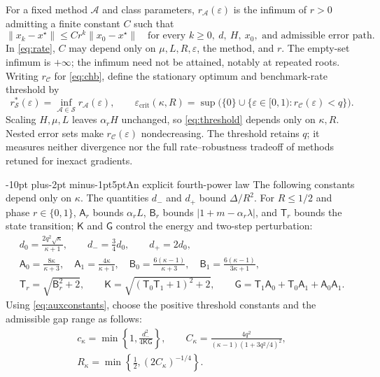 \documentclass[pdflatex,sn-mathphys-num]{sn-jnl}
\makeatletter
\renewcommand\section{\@startsection{section}{1}{\z@}%
  {-10pt plus-2pt minus-1pt}{5pt}{\sectionfont}}
\theoremstyle{thmstyleone}
\theoremstyle{thmstyletwo}
\newcommand{\crit}{\mathrm{crit}}
\newcommand{\cT}{\mathsf T}
\newcommand{\cK}{\mathsf K}
\newcommand{\cG}{\mathsf G}
\newcommand{\norm}[1]{\left\lVert #1\right\rVert}
\makeatother
\begin{document}
For a fixed method $\mathcal A$ and class parameters,
$r_{\mathcal A}(\varepsilon)$ is the infimum of $r>0$ admitting
a finite constant $C$ such that
\begin{equation}\label{eq:rate}
 \norm{x_k-x^\star}\leq C r^k\norm{x_0-x^\star}
 \quad\text{for every }k\geq0,\ d,\ H,\ x_0,\text{ and admissible error path}.
\end{equation}
In \eqref{eq:rate}, $C$ may depend only on $\mu,L,R,\varepsilon$,
the method, and $r$. The empty-set infimum is $+\infty$;
the infimum need not be attained, notably at repeated roots.
Writing $r_{\mathcal C}$ for \eqref{eq:chb}, define the stationary
optimum and benchmark-rate threshold by
\begin{equation}\label{eq:threshold}
 r_{\mathcal S}^*(\varepsilon)
   =\inf_{\mathcal A\in\mathcal S}r_{\mathcal A}(\varepsilon),
 \qquad
 \varepsilon_{\crit}(\kappa,R)
   =\sup\bigl(\{0\}\cup
     \{\varepsilon\in[0,1):r_{\mathcal C}(\varepsilon)<q\}\bigr).
\end{equation}
Scaling $H,\mu,L$ leaves $\alpha_rH$ unchanged, so
\eqref{eq:threshold} depends only on $\kappa,R$. Nested error sets make
$r_{\mathcal C}(\varepsilon)$ nondecreasing. The threshold retains $q$;
it measures neither divergence nor the full rate--robustness tradeoff
of methods retuned for inexact gradients.

\section{An explicit fourth-power law}\label{sec:main}
The following constants depend only on $\kappa$. The quantities $d_-$
and $d_+$ bound $\Delta/R^2$. For $R\leq1/2$ and phase $r\in\{0,1\}$,
$\mathsf A_r$ bounds $\alpha_rL$, $\mathsf B_r$ bounds
$|1+m-\alpha_r\lambda|$, and $\cT_r$ bounds the state transition;
$\cK$ and $\cG$ control the energy and two-step perturbation:
\begin{equation}\label{eq:auxconstants}
\begin{gathered}
 d_0=\frac{2q^2\sqrt\kappa}{\kappa+1},\qquad
 d_-=\tfrac34d_0,\qquad d_+=2d_0,\\
 \mathsf A_0=\frac{8\kappa}{\kappa+3},\quad
 \mathsf A_1=\frac{4\kappa}{\kappa+1},\quad
 \mathsf B_0=\frac{6(\kappa-1)}{\kappa+3},\quad
 \mathsf B_1=\frac{6(\kappa-1)}{3\kappa+1},\\
 \cT_r=\sqrt{\mathsf B_r^2+2},\qquad
 \cK=\sqrt{(\cT_0\cT_1+1)^2+2},\qquad
 \cG=\cT_1\mathsf A_0+\cT_0\mathsf A_1+\mathsf A_0\mathsf A_1.
\end{gathered}
\end{equation}
Using \eqref{eq:auxconstants}, choose the positive threshold constants
and the admissible gap range as follows:
\begin{equation}\label{eq:mainconstants}
\begin{gathered}
 c_\kappa=\min\left\{1,\frac{d_-^2}{4\cK\cG}\right\},\qquad
 C_\kappa=\frac{4q^2}{(\kappa-1)(1+3q^2/4)^2},\\
 R_\kappa=\min\left\{\frac12,(2C_\kappa)^{-1/4}\right\}.
\end{gathered}
\end{equation}
\end{document}

